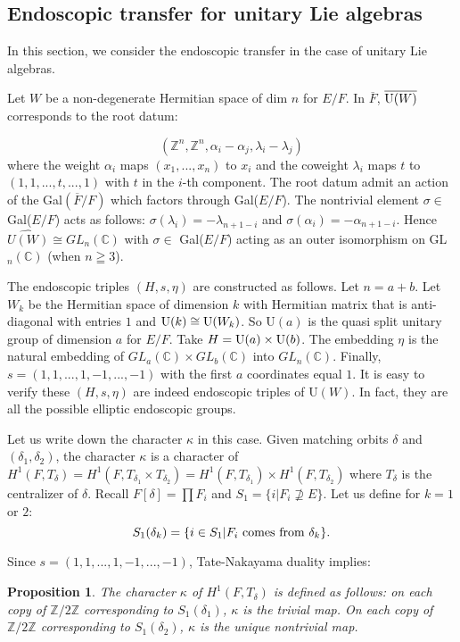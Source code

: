 \documentclass[11pt, oneside,reqno]{amsart}   	%
\newtheorem{proposition}[theorem]{Proposition}
\begin{document}
\subsection{Endoscopic transfer for unitary Lie algebras}

In this section, we consider the endoscopic transfer in the case of unitary Lie algebras. 

Let $W$ be a non-degenerate Hermitian space of dim $n$ for $E/F$. In $\overline{F}$, $\overline{\textup{U}(W)}$ corresponds to the root datum:

$$(\mathbb{Z}^n,\mathbb{Z}^n,\alpha_i-\alpha_j,\lambda_i-\lambda_j)$$
where the weight $\alpha_i$ maps $(x_1,...,x_n)$ to $x_i$ and the coweight $\lambda_i$ maps $t$ to $(1,1,...,t,...,1)$ with $t$ in the $i$-th component. The root datum admit an action of the Gal$(\overline{F}/F)$ which factors through Gal($E/F$). The nontrivial element $\sigma \in$ Gal($E/F$) acts as follows: $\sigma(\lambda_i)=-\lambda_{n+1-i}$ and $\sigma(\alpha_i)=-\alpha_{n+1-i}$. Hence $\widehat{U(W)} \cong GL_n(\mathbb{C})$ with $\sigma \in$ Gal($E/F$) acting as an outer isomorphism on GL$_n(\mathbb{C})$ (when $n \geqq 3$).

The endoscopic triples $(H, s, \eta)$ are constructed as follows. Let $n=a+b$. Let $W_k$ be the Hermitian space of dimension $k$ with Hermitian matrix that is anti-diagonal with entries $1$ and $ \textup{U}(k) \cong \textup{U}(W_k)$. So U$(a)$ is the quasi split unitary group of dimension $a$ for $E/F$. Take $H=\textup{U}(a) \times \textup{U}(b)$. The embedding $\eta$ is the natural embedding of $GL_{a}(\mathbb{C}) \times GL_{b}(\mathbb{C})$ into $GL_n(\mathbb{C})$. Finally, $s=(1,1,...,1,-1,...,-1)$ with the first $a$ coordinates equal $1$. It is easy to verify these $(H, s, \eta)$ are indeed endoscopic triples of U$(W)$. In fact, they are all the possible elliptic endoscopic groups.

Let us write down the character $\kappa$ in this case. Given matching orbits $\delta$ and $(\delta_1,\delta_2)$, the character $\kappa$ is a character of $H^1(F,T_\delta)=H^1(F,T_{\delta_1}\times T_{\delta_2})=H^1(F,T_{\delta_1}) \times H^1(F,T_{\delta_2})$ where $T_\delta$ is the centralizer of $\delta$. Recall $F[\delta]=\prod F_i$ and $S_1=\{i|F_i \nsupseteq E\}$. Let us define for $k=1$ or $2$: $$S_1(\delta_k)=\{i \in S_1|F_i \textup{ comes from } \delta_k\}.$$

Since $s=(1,1,...,1,-1,...,-1)$, Tate-Nakayama duality implies:

\begin{proposition} \label{definition of kappa}
The character $\kappa$ of $H^1(F,T_\delta)$ is defined as follows: on each copy of $\mathbb{Z}/2\mathbb{Z}$ corresponding to $S_1(\delta_1)$, $\kappa$ is the trivial map. On each copy of $\mathbb{Z}/2\mathbb{Z}$ corresponding to $S_1(\delta_2)$, $\kappa$ is the unique nontrivial map.
\end{proposition}
\end{document}
